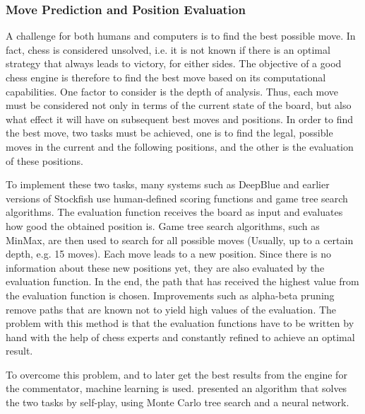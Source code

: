 \subsubsection{Move Prediction and Position Evaluation}

A challenge for both humans and computers is to find the best possible move. In fact, chess is considered unsolved, i.e. it is not known if there is an optimal strategy that always leads to victory, for either sides. The objective of a good chess engine is therefore to find the best move based on its computational capabilities. One factor to consider is the depth of analysis. Thus, each move must be considered not only in terms of the current state of the board, but also what effect it will have on subsequent best moves and positions. In order to find the best move, two tasks must be achieved, one is to find the legal, possible moves in the current and the following positions, and the other is the evaluation of these positions.

To implement these two tasks, many systems such as DeepBlue and earlier versions of \Gls{Stockfish} use human-defined scoring functions and game tree search algorithms. The evaluation function receives the board as input and evaluates how good the obtained position is. Game tree search algorithms, such as MinMax, are then used to search for all possible moves (Usually, up to a certain depth, e.g. 15 moves). Each move leads to a new position. Since there is no information about these new positions yet, they are also evaluated by the evaluation function. In the end, the path that has received the highest value from the evaluation function is chosen. Improvements such as alpha-beta pruning remove paths that are known not to yield high values of the evaluation. The problem with this method is that the evaluation functions have to be written by hand with the help of chess experts and constantly refined to achieve an optimal result.

To overcome this problem, and to later get the best results from the engine for the commentator, machine learning is used. \cite{alphazero-2018} presented an algorithm that solves the two tasks by self-play, using Monte Carlo tree search and a neural network.